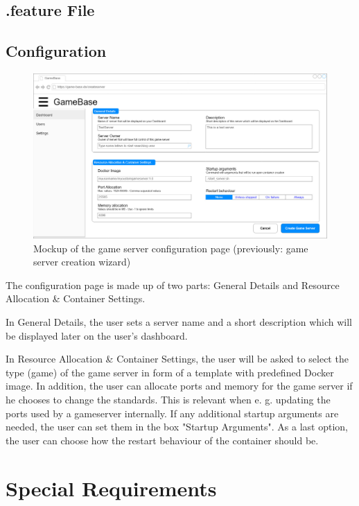 \documentclass[a4paper,12pt,chapterprefix=false,bibliography=totoc,listof=totoc,]{scrreprt}
\begin{document}
\section{.feature File}
\begin{minipage}{\textwidth}

\end{minipage}

\section{Configuration}
\begin{figure}
    \includegraphics[width=\textwidth]{diagramms/UCConfigureGameServerMockup.jpg}
    \caption{Mockup of the game server configuration page (previously: game server creation wizard)}
    \label{fig:mockup}
\end{figure}
The configuration page is made up of two parts: General Details and Resource Allocation \& Container Settings.

In General Details, the user sets a server name and a short description which will be displayed later on the user's dashboard.

In Resource Allocation \& Container Settings, the user will be asked to select the type (game) of the game server in form of a template with predefined Docker image. In addition, the user can allocate ports and memory for the game server if he chooses to change the standards. This is relevant when e. g. updating the ports used by a gameserver internally. If any additional startup arguments are needed, the user can set them in the box "Startup Arguments". As a last option, the user can choose how the restart behaviour of the container should be.

\chapter{Special Requirements}
\end{document}
